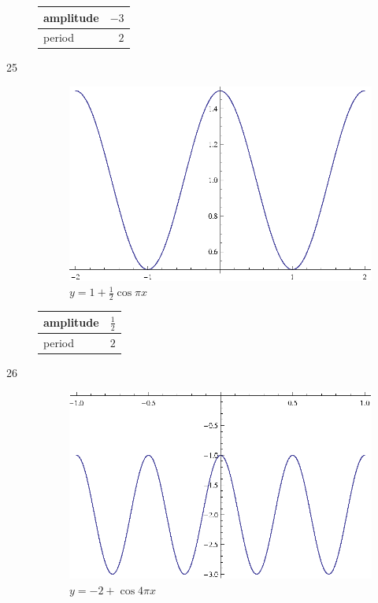 \documentclass{exam}
\begin{document}
\begin{description}
        \begin{tabular}[H]{lr}
          \toprule
          amplitude & $-3$ \\
          \midrule
          period & $2$ \\
          \bottomrule
        \end{tabular}

      \item[25]
        \begin{figure}[H]
          \centering
          \includegraphics[scale=0.9]{exercise25.eps}
          \caption{$y = 1 + \frac{1}{2} \cos \pi x$}
        \end{figure}

        \begin{tabular}[H]{lr}
          \toprule
          amplitude & $\frac{1}{2}$ \\
          \midrule
          period & $2$ \\
          \bottomrule
        \end{tabular}

      \item[26]
        \begin{figure}[H]
          \centering
          \includegraphics[scale=0.9]{exercise26.eps}
          \caption{$y = -2 + \cos 4 \pi x$}
        \end{figure}


\end{description}
\end{document}
